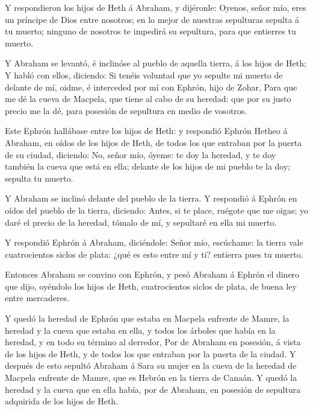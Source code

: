  Y respondieron los hijos de Heth á Abraham, y dijéronle:
 Oyenos, señor mío, eres un príncipe de Dios entre nosotros;
en lo mejor de nuestras sepulturas sepulta á tu muerto; ninguno de
nosotros te impedirá su sepultura, para que entierres tu muerto.

 Y Abraham se levantó, é inclinóse al pueblo de aquella
tierra, á los hijos de Heth;  Y habló con ellos, diciendo:
Si tenéis voluntad que yo sepulte mi muerto de delante de mí, oidme, é
interceded por mí con Ephrón, hijo de Zohar,  Para que me dé
la cueva de Macpela, que tiene al cabo de su heredad: que por su justo
precio me la dé, para posesión de sepultura en medio de vosotros.

 Este Ephrón hallábase entre los hijos de Heth: y respondió
Ephrón Hetheo á Abraham, en oídos de los hijos de Heth, de todos los que
entraban por la puerta de su ciudad, diciendo:  No, señor
mío, óyeme: te doy la heredad, y te doy también la cueva que está en
ella; delante de los hijos de mi pueblo te la doy; sepulta tu muerto.

 Y Abraham se inclinó delante del pueblo de la tierra.
 Y respondió á Ephrón en oídos del pueblo de la tierra,
diciendo: Antes, si te place, ruégote que me oigas; yo daré el precio de
la heredad, tómalo de mí, y sepultaré en ella mi muerto.

 Y respondió Ephrón á Abraham, diciéndole: 
Señor mío, escúchame: la tierra vale cuatrocientos siclos de plata: ¿qué
es esto entre mí y ti? entierra pues tu muerto.

 Entonces Abraham se convino con Ephrón, y pesó Abraham á
Ephrón el dinero que dijo, oyéndolo los hijos de Heth, cuatrocientos
siclos de plata, de buena ley entre mercaderes.

 Y quedó la heredad de Ephrón que estaba en Macpela
enfrente de Mamre, la heredad y la cueva que estaba en ella, y todos los
árboles que había en la heredad, y en todo su término al derredor,
 Por de Abraham en posesión, á vista de los hijos de Heth,
y de todos los que entraban por la puerta de la ciudad.  Y
después de esto sepultó Abraham á Sara su mujer en la cueva de la
heredad de Macpela enfrente de Mamre, que es Hebrón en la tierra de
Canaán.  Y quedó la heredad y la cueva que en ella había,
por de Abraham, en posesión de sepultura adquirida de los hijos de Heth.

